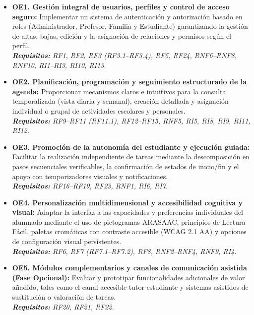 \begin{itemize}[leftmargin=1.2em, itemsep=0.8em]
    \item \textbf{OE1. Gestión integral de usuarios, perfiles y control de acceso seguro:} Implementar un sistema de autenticación y autorización basado en roles (Administrador, Profesor, Familia y Estudiante) garantizando la gestión de altas, bajas, edición y la asignación de relaciones y permisos según el perfil.
    \nobreak\\[0.2em]\textit{\footnotesize \textbf{Requisitos:} RF1, RF2, RF3 (RF3.1--RF3.4), RF5, RF24, RNF6--RNF8, RNF10, RI1--RI3, RI10, RI13.}

    \item \textbf{OE2. Planificación, programación y seguimiento estructurado de la agenda:} Proporcionar mecanismos claros e intuitivos para la consulta temporalizada (vista diaria y semanal), creación detallada y asignación individual o grupal de actividades escolares y personales.
    \nobreak\\[0.2em]\textit{\footnotesize \textbf{Requisitos:} RF9--RF11 (RF11.1), RF12--RF15, RNF5, RI5, RI8, RI9, RI11, RI12.}

    \item \textbf{OE3. Promoción de la autonomía del estudiante y ejecución guiada:} Facilitar la realización independiente de tareas mediante la descomposición en pasos secuenciales verificables, la confirmación de estados de inicio/fin y el apoyo con temporizadores visuales y notificaciones.
    \nobreak\\[0.2em]\textit{\footnotesize \textbf{Requisitos:} RF16--RF19, RF23, RNF1, RI6, RI7.}

    \item \textbf{OE4. Personalización multidimensional y accesibilidad cognitiva y visual:} Adaptar la interfaz a las capacidades y preferencias individuales del alumnado mediante el uso de pictogramas ARASAAC, principios de Lectura Fácil, paletas cromáticas con contraste accesible (WCAG 2.1 AA) y opciones de configuración visual persistentes.
    \nobreak\\[0.2em]\textit{\footnotesize \textbf{Requisitos:} RF6, RF7 (RF7.1--RF7.2), RF8, RNF2--RNF4, RNF9, RI4.}

    \item \textbf{OE5. Módulos complementarios y canales de comunicación asistida (Fase Opcional):} Evaluar y prototipar funcionalidades adicionales de valor añadido, tales como el canal accesible tutor-estudiante y sistemas asistidos de sustitución o valoración de tareas.
    \nobreak\\[0.2em]\textit{\footnotesize \textbf{Requisitos:} RF20, RF21, RF22.}
\end{itemize}




